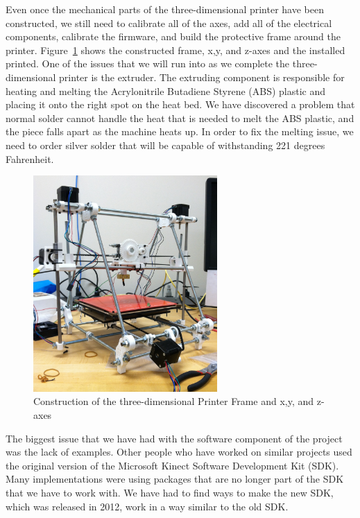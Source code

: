 \documentclass[pdftex,10.5pt]{report}
\begin{document}
Even once the mechanical parts of the three-dimensional printer have been constructed, we still need to calibrate all of the axes, add all of the electrical components, calibrate the firmware, and build the protective frame around the printer. Figure~\ref{basebuilt} shows the constructed frame, x,y, and z-axes and the installed printed. One of the issues that we will run into as we complete the three-dimensional printer is the extruder. The extruding component is responsible for heating and melting the Acrylonitrile Butadiene Styrene (ABS) plastic and placing it onto the right spot on the heat bed. We have discovered a problem that normal solder cannot handle the heat that is needed to melt the ABS plastic, and the piece falls apart as the machine heats up. In order to fix the melting issue, we need to order silver solder that will be capable of withstanding 221 degrees Fahrenheit. 

\begin{figure}[H]
	\centering
	\includegraphics[width=70mm]{figures/photo.JPG}
	\caption{Construction of the three-dimensional Printer Frame and x,y, and z-axes}
	\label{basebuilt}
\end{figure}

The biggest issue that we have had with the software component of the project was the lack of examples. Other people who have worked on similar projects used the original version of the Microsoft Kinect Software Development Kit (SDK). Many implementations were using packages that are no longer part of the SDK that we have to work with. We have had to find ways to make the new SDK, which was released in 2012, work in a way similar to the old SDK. 
\end{document}
